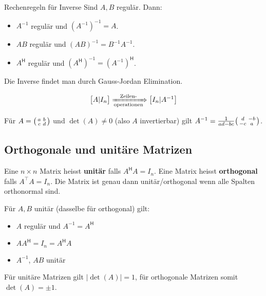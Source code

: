 \documentclass[a4paper,10pt]{article}
\newcommand*{\hermconj}{\mathsf{H}}
\begin{document}
\begin{subbox}{Rechenregeln für Inverse}
  Sind $A, B$ regulär. Dann:

  \begin{itemize}
    \item $A^{-1}$ regulär und $(A^{-1})^{-1} = A$.
    \item $AB$ regulär und $(AB)^{-1} = B^{-1} A^{-1}$.
    \item $A^\hermconj$ regulär und $(A^\hermconj)^{-1} = (A^{-1})^\hermconj$.
  \end{itemize}
\end{subbox}

Die Inverse findet man durch Gauss-Jordan Elimination.

$$\begin{bmatrix*}
  A | I_n
\end{bmatrix*} \xRightarrow[\text{operationen}]{\text{Zeilen-}} \begin{bmatrix*}
  I_n | A^{-1}
\end{bmatrix*}$$

Für $A = \begin{psmallmatrix*}
  a & b \\
  c & d
\end{psmallmatrix*}$ und $\det(A) \neq 0$ (also $A$ invertierbar) gilt $A^{-1} = \frac{1}{ad - bc} \begin{psmallmatrix*}
  d & -b \\
  -c & a
\end{psmallmatrix*}$.

\subsection{Orthogonale und unitäre Matrizen}

Eine $n \times n$ Matrix heisst \textbf{unitär} falls $A^\hermconj A = I_n$. Eine Matrix heisst \textbf{orthogonal} falls $A^\top A = I_n$. Die Matrix ist genau dann unitär/orthogonal wenn alle Spalten orthonormal sind.

Für $A, B$ unitär (dasselbe für orthogonal) gilt:

\begin{itemize}
  \item $A$ regulär und $A^{-1} = A^\hermconj$
  \item $AA^\hermconj = I_n = A^\hermconj A$
  \item $A^{-1}$, $AB$ unitär
\end{itemize}

Für unitäre Matrizen gilt $| \det(A) | = 1$, für orthogonale Matrizen somit $\det(A) = \pm 1$.\\
\end{document}
